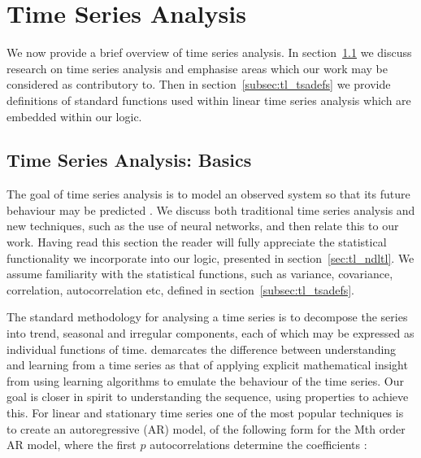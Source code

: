 \section{Time Series Analysis}\label{sec:tl_tsa}
We now provide a brief overview of time series analysis. In
section~\ref{subsec:tl_tsabasic} we discuss research on time series
analysis and emphasise areas which our work may be considered as
contributory to. Then in section~\ref{subsec:tl_tsadefs} we provide
definitions of standard functions used within linear time series
analysis which are embedded within our logic.

\subsection{Time Series Analysis: Basics}\label{subsec:tl_tsabasic}

The goal of time series analysis is to model an observed system so
that its future behaviour may be predicted \cite{wg94}. We discuss
both traditional time series analysis and new techniques, such as the
use of neural networks, and then relate this to our work. Having read
this section the reader will fully appreciate the statistical
functionality we incorporate into our logic, presented in
section~\ref{sec:tl_ndltl}. We assume familiarity with the statistical
functions, such as variance, covariance, correlation, autocorrelation
etc, defined in section~\ref{subsec:tl_tsadefs}.

\medskip

The standard methodology for analysing a time series is to decompose
the series into trend, seasonal and irregular components, each of
which may be expressed as individual functions of time. \cite{wg94}
demarcates the difference between understanding and learning from a
time series as that of applying explicit mathematical insight from using
learning algorithms to emulate the behaviour of the time series. Our
goal is closer in spirit to understanding the sequence, using
properties to achieve this. For linear and stationary time series one
of the most popular techniques is to create an autoregressive (AR) model,
of the following form for the Mth order AR model, where the first $p$
autocorrelations determine the coefficients \cite{end95}:

